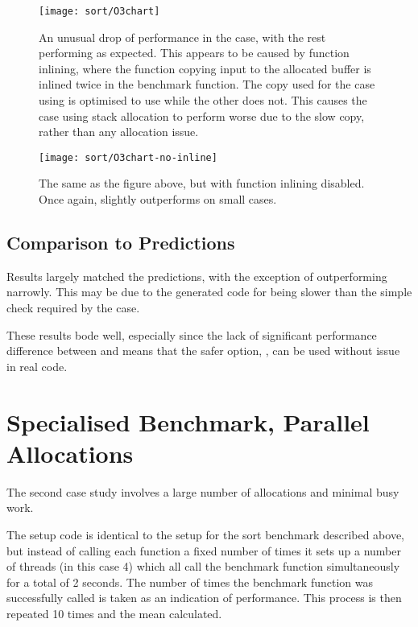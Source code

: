 \begin{figure}[ph]
	\centering
	\texttt{[image: sort/O3chart]}
	\caption{An unusual drop of performance in the  case, with the rest performing as expected. This appears to be caused by function inlining, where the function copying input to the allocated buffer is inlined twice in the  benchmark function. The copy used for the case using \malloc{} is optimised to use  while the other does not. This causes the case using stack allocation to perform worse due to the slow copy, rather than any allocation issue.}
\end{figure}

\begin{figure}[ph]
	\centering
	\texttt{[image: sort/O3chart-no-inline]}
	\caption{The same as the figure above, but with function inlining disabled. Once again,  slightly outperforms  on small cases.}\label{lastsort}
\end{figure}

\subsection{Comparison to Predictions}

Results largely matched the predictions, with the exception of  outperforming  narrowly. This may be due to the generated code for  being slower than the simple check required by the  case.

These results bode well, especially since the lack of significant performance difference between  and  means that the safer option, , can be used without issue in real code.

\pagebreak

\section{Specialised Benchmark, Parallel Allocations}

The second case study involves a large number of allocations and minimal busy work.

The setup code is identical to the setup for the sort benchmark described above, but instead of calling each function a fixed number of times it sets up a number of threads (in this case 4) which all call the benchmark function simultaneously for a total of 2 seconds. The number of times the benchmark function was successfully called is taken as an indication of performance. This process is then repeated 10 times and the mean calculated.

